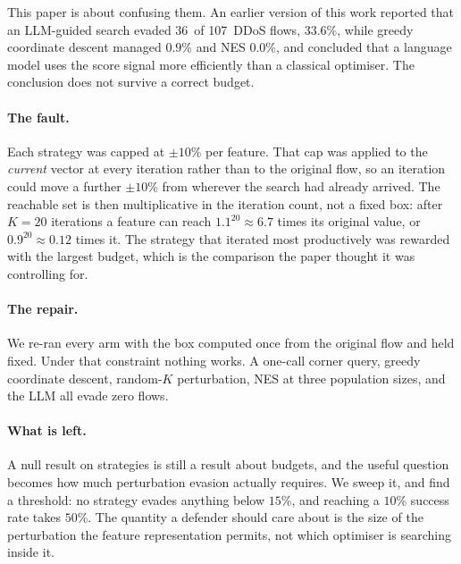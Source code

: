 \documentclass[journal]{IEEEtran}
\theoremstyle{definition}
\newcommand{\Ntotal}{107}
\newcommand{\Kbudget}{20}
\newcommand{\budgetpct}{10}
\newcommand{\LLMesr}{33.6}
\newcommand{\LLMevaded}{36}
\newcommand{\GREesr}{0.9}
\newcommand{\NESesr}{0.0}
\newcommand{\CEpsFirst}{15}
\newcommand{\CEpsTen}{50}
\begin{document}
This paper is about confusing them. An earlier version of this work reported
that an LLM-guided search evaded \LLMevaded\ of \Ntotal\ DDoS flows,
$\LLMesr$\%, while greedy coordinate descent managed $\GREesr$\% and NES
$\NESesr$\%, and concluded that a language model uses the score signal more
efficiently than a classical optimiser. The conclusion does not survive a
correct budget.

\paragraph{The fault.} Each strategy was capped at $\pm\budgetpct$\% per
feature. That cap was applied to the \emph{current} vector at every iteration
rather than to the original flow, so an iteration could move a further
$\pm\budgetpct$\% from wherever the search had already arrived. The reachable
set is then multiplicative in the iteration count, not a fixed box: after
$K=\Kbudget$ iterations a feature can reach $1.1^{\Kbudget} \approx 6.7$ times
its original value, or $0.9^{\Kbudget} \approx 0.12$ times it. The strategy that
iterated most productively was rewarded with the largest budget, which is the
comparison the paper thought it was controlling for.

\paragraph{The repair.} We re-ran every arm with the box computed once from the
original flow and held fixed. Under that constraint nothing works. A one-call
corner query, greedy coordinate descent, random-$K$ perturbation, NES at three
population sizes, and the LLM all evade zero flows.

\paragraph{What is left.} A null result on strategies is still a result about
budgets, and the useful question becomes how much perturbation evasion actually
requires. We sweep it, and find a threshold: no strategy evades anything below
$\CEpsFirst$\%, and reaching a $10$\% success rate takes $\CEpsTen$\%. The
quantity a defender should care about is the size of the perturbation the
feature representation permits, not which optimiser is searching inside it.
\end{document}
